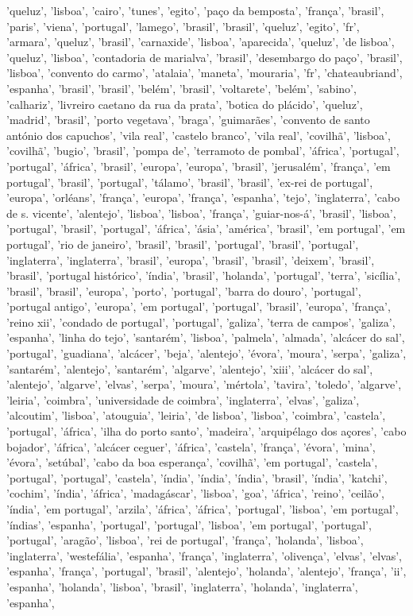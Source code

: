 \documentclass{article}
\begin{document}
\begin{itemize}
'queluz', 'lisboa', 'cairo', 'tunes', 'egito', 'paço da bemposta', 'frança', 'brasil', 'paris', 'viena', 'portugal', 'lamego', 'brasil', 'brasil', 'queluz', 'egito', 'fr', 'armara', 'queluz', 'brasil', 'carnaxide', 'lisboa', 'aparecida', 'queluz', 'de lisboa', 'queluz', 'lisboa', 'contadoria de marialva', 'brasil', 'desembargo do paço', 'brasil', 'lisboa', 'convento do carmo', 'atalaia', 'maneta', 'mouraria', 'fr', 'chateaubriand', 'espanha', 'brasil', 'brasil', 'belém', 'brasil', 'voltarete', 'belém', 'sabino', 'calhariz', 'livreiro caetano da rua da prata', 'botica do plácido', 'queluz', 'madrid', 'brasil', 'porto vegetava', 'braga', 'guimarães', 'convento de santo antónio dos capuchos', 'vila real', 'castelo branco', 'vila real', 'covilhã', 'lisboa', 'covilhã', 'bugio', 'brasil', 'pompa de', 'terramoto de pombal', 'áfrica', 'portugal', 'portugal', 'áfrica', 'brasil', 'europa', 'europa', 'brasil', 'jerusalém', 'frança', 'em portugal', 'brasil', 'portugal', 'tálamo', 'brasil', 'brasil', 'ex-rei de portugal', 'europa', 'orléans', 'frança', 'europa', 'frança', 'espanha', 'tejo', 'inglaterra', 'cabo de s. vicente', 'alentejo', 'lisboa', 'lisboa', 'frança', 'guiar-nos-á', 'brasil', 'lisboa', 'portugal', 'brasil', 'portugal', 'áfrica', 'ásia', 'américa', 'brasil', 'em portugal', 'em portugal', 'rio de janeiro', 'brasil', 'brasil', 'portugal', 'brasil', 'portugal', 'inglaterra', 'inglaterra', 'brasil', 'europa', 'brasil', 'brasil', 'deixem', 'brasil', 'brasil', 'portugal histórico', 'índia', 'brasil', 'holanda', 'portugal', 'terra', 'sicília', 'brasil', 'brasil', 'europa', 'porto', 'portugal', 'barra do douro', 'portugal', 'portugal antigo', 'europa', 'em portugal', 'portugal', 'brasil', 'europa', 'frança', 'reino xii', 'condado de portugal', 'portugal', 'galiza', 'terra de campos', 'galiza', 'espanha', 'linha do tejo', 'santarém', 'lisboa', 'palmela', 'almada', 'alcácer do sal', 'portugal', 'guadiana', 'alcácer', 'beja', 'alentejo', 'évora', 'moura', 'serpa', 'galiza', 'santarém', 'alentejo', 'santarém', 'algarve', 'alentejo', 'xiii', 'alcácer do sal', 'alentejo', 'algarve', 'elvas', 'serpa', 'moura', 'mértola', 'tavira', 'toledo', 'algarve', 'leiria', 'coimbra', 'universidade de coimbra', 'inglaterra', 'elvas', 'galiza', 'alcoutim', 'lisboa', 'atouguia', 'leiria', 'de lisboa', 'lisboa', 'coimbra', 'castela', 'portugal', 'áfrica', 'ilha do porto santo', 'madeira', 'arquipélago dos açores', 'cabo bojador', 'áfrica', 'alcácer ceguer', 'áfrica', 'castela', 'frança', 'évora', 'mina', 'évora', 'setúbal', 'cabo da boa esperança', 'covilhã', 'em portugal', 'castela', 'portugal', 'portugal', 'castela', 'índia', 'índia', 'índia', 'brasil', 'índia', 'katchi', 'cochim', 'índia', 'áfrica', 'madagáscar', 'lisboa', 'goa', 'áfrica', 'reino', 'ceilão', 'índia', 'em portugal', 'arzila', 'áfrica', 'áfrica', 'portugal', 'lisboa', 'em portugal', 'índias', 'espanha', 'portugal', 'portugal', 'lisboa', 'em portugal', 'portugal', 'portugal', 'aragão', 'lisboa', 'rei de portugal', 'frança', 'holanda', 'lisboa', 'inglaterra', 'westefália', 'espanha', 'frança', 'inglaterra', 'olivença', 'elvas', 'elvas', 'espanha', 'frança', 'portugal', 'brasil', 'alentejo', 'holanda', 'alentejo', 'frança', 'ii', 'espanha', 'holanda', 'lisboa', 'brasil', 'inglaterra', 'holanda', 'inglaterra', 'espanha', 
\end{itemize}
\end{document}
